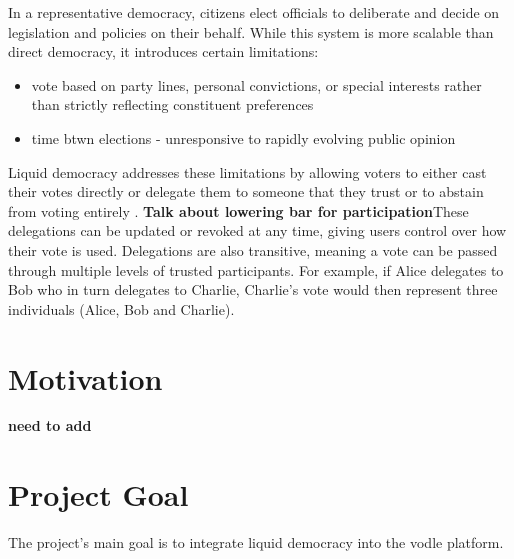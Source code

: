 In a representative democracy, citizens elect officials to deliberate and decide on legislation and policies on their behalf. While this system is more scalable than direct democracy, it introduces certain limitations: \\
\begin{itemize}
    \item vote based on party lines, personal convictions, or special interests rather than strictly reflecting constituent preferences
    \item time btwn elections - unresponsive to rapidly evolving public opinion
\end{itemize}

Liquid democracy addresses these limitations by allowing voters to either cast their votes directly or delegate them to someone that they trust or to abstain from voting entirely \citep{blum_liquid_2016}. \textbf{Talk about lowering bar for participation}These delegations can be updated or revoked at any time, giving users control over how their vote is used. Delegations are also transitive, meaning a vote can be passed through multiple levels of trusted participants. For example, if Alice delegates to Bob who in turn delegates to Charlie, Charlie's vote would then represent three individuals (Alice, Bob and Charlie).



\section{Motivation}

\textbf{need to add}

\section{Project Goal}
The project's main goal is to integrate liquid democracy into the vodle platform.

